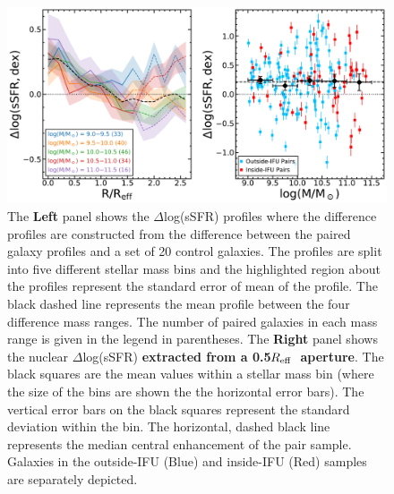 \documentclass[iop,revtex4,twocolumn,apj,numberedappendix,appendixfloats]{emulateapj}
\newcommand{\reff}{$R_{\rm eff}$}
\begin{document}
\begin{figure}
\centering
\includegraphics[width=0.8\linewidth]{fig/ssfr_mass.pdf}
\caption[]{The \textbf{Left} panel shows the $\Delta$log(sSFR) profiles where the difference profiles are constructed from the difference between the paired galaxy profiles and a set of 20 control galaxies. The profiles are split into five different stellar mass bins and the highlighted region about the profiles represent the standard error of mean of the profile. The black dashed line represents the mean profile between the four difference mass ranges. The number of paired galaxies in each mass range is given in the legend in parentheses. The \textbf{Right} panel shows the nuclear $\Delta$log(sSFR) \textbf{extracted from a 0.5\reff\ aperture}. The black squares are the mean values within a stellar mass bin (where the size of the bins are shown the the horizontal error bars). The vertical error bars on the black squares represent the standard deviation within the bin. The horizontal, dashed black line represents the median central enhancement of the pair sample. Galaxies in the outside-IFU (Blue) and inside-IFU (Red) samples are separately depicted.}
\label{fig:ssfr_mass}
\end{figure}
\end{document}

